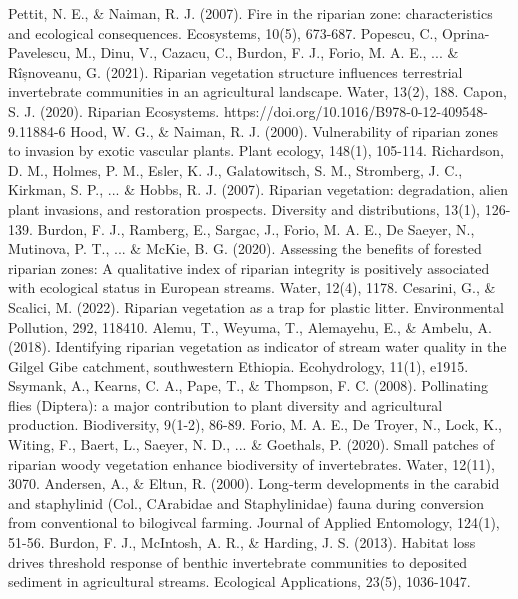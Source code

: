\documentclass[12pt]{article}
\numberwithin{equation}{section}
\begin{document}
\begin{thebibliography}{99}
  Pettit, N. E., \& Naiman, R. J. (2007). Fire in the riparian zone: characteristics and ecological consequences. Ecosystems, 10(5), 673-687.
  Popescu, C., Oprina-Pavelescu, M., Dinu, V., Cazacu, C., Burdon, F. J., Forio, M. A. E., ... \& Rîșnoveanu, G. (2021). Riparian vegetation structure influences terrestrial invertebrate communities in an agricultural landscape. Water, 13(2), 188.
  Capon, S. J. (2020). Riparian Ecosystems. https://doi.org/10.1016/B978-0-12-409548-9.11884-6
  Hood, W. G., \& Naiman, R. J. (2000). Vulnerability of riparian zones to invasion by exotic vascular plants. Plant ecology, 148(1), 105-114.
  Richardson, D. M., Holmes, P. M., Esler, K. J., Galatowitsch, S. M., Stromberg, J. C., Kirkman, S. P., ... \& Hobbs, R. J. (2007). Riparian vegetation: degradation, alien plant invasions, and restoration prospects. Diversity and distributions, 13(1), 126-139.
  Burdon, F. J., Ramberg, E., Sargac, J., Forio, M. A. E., De Saeyer, N., Mutinova, P. T., ... \& McKie, B. G. (2020). Assessing the benefits of forested riparian zones: A qualitative index of riparian integrity is positively associated with ecological status in European streams. Water, 12(4), 1178.
  Cesarini, G., \& Scalici, M. (2022). Riparian vegetation as a trap for plastic litter. Environmental Pollution, 292, 118410.
  Alemu, T., Weyuma, T., Alemayehu, E., \& Ambelu, A. (2018). Identifying riparian vegetation as indicator of stream water quality in the Gilgel Gibe catchment, southwestern Ethiopia. Ecohydrology, 11(1), e1915.
  Ssymank, A., Kearns, C. A., Pape, T., \& Thompson, F. C. (2008). Pollinating flies (Diptera): a major contribution to plant diversity and agricultural production. Biodiversity, 9(1-2), 86-89.
  Forio, M. A. E., De Troyer, N., Lock, K., Witing, F., Baert, L., Saeyer, N. D., ... \& Goethals, P. (2020). Small patches of riparian woody vegetation enhance biodiversity of invertebrates. Water, 12(11), 3070.
  Andersen, A., \& Eltun, R. (2000). Long‐term developments in the carabid and staphylinid (Col., CArabidae and Staphylinidae) fauna during conversion from conventional to bilogivcal farming. Journal of Applied Entomology, 124(1), 51-56.
  Burdon, F. J., McIntosh, A. R., \& Harding, J. S. (2013). Habitat loss drives threshold response of benthic invertebrate communities to deposited sediment in agricultural streams. Ecological Applications, 23(5), 1036-1047.

\end{thebibliography}
\end{document}
